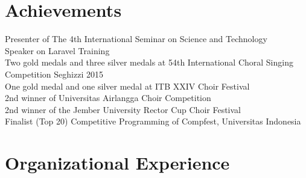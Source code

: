 \documentclass[letterpaper]{deedy-resume} %
\begin{document}
\begin{minipage}[t]{0.66\textwidth}



\end{minipage} %

\newpage %
\begin{minipage}[t]{0.39\textwidth}


\section{Achievements}
  Presenter of The 4th International Seminar on Science and Technology \\
  Speaker on Laravel Training \\
  Two gold medals and three silver medals at 54th International Choral Singing Competition Seghizzi 2015 \\
  One gold medal and one silver medal at ITB XXIV Choir Festival \\
  2nd winner of Universitas Airlangga Choir Competition \\
  2nd winner of the Jember University Rector Cup Choir Festival \\
  Finalist (Top 20) Competitive Programming of Compfest, Universitas Indonesia \\
\sectionspace


\section{Organizational Experience}


\end{minipage}
\end{document}
